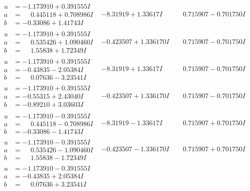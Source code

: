 \documentclass[1p]{elsarticle_modified}
\theoremstyle{definition}
\begin{document}
$$\begin{array}{c|c|c}
\begin{aligned}
u &= -1.173910 + 0.391555 I \\
a &= \phantom{-}0.445118 + 0.708986 I \\
b &= -0.33086 + 1.41743 I\end{aligned}
 & -8.31919 + 1.33617 I & \phantom{-}0.715907 - 0.701750 I \\ \hline\begin{aligned}
u &= -1.173910 + 0.391555 I \\
a &= \phantom{-}0.535426 + 1.090460 I \\
b &= \phantom{-}1.55838 + 1.72349 I\end{aligned}
 & -0.423507 + 1.336170 I & \phantom{-}0.715907 - 0.701750 I \\ \hline\begin{aligned}
u &= -1.173910 + 0.391555 I \\
a &= -0.43835 - 2.05384 I \\
b &= \phantom{-}0.07636 - 3.23541 I\end{aligned}
 & -8.31919 + 1.33617 I & \phantom{-}0.715907 - 0.701750 I \\ \hline\begin{aligned}
u &= -1.173910 + 0.391555 I \\
a &= -0.55315 + 2.43040 I \\
b &= -0.89210 + 3.03603 I\end{aligned}
 & -0.423507 + 1.336170 I & \phantom{-}0.715907 - 0.701750 I \\ \hline\begin{aligned}
u &= -1.173910 - 0.391555 I \\
a &= \phantom{-}0.445118 - 0.708986 I \\
b &= -0.33086 - 1.41743 I\end{aligned}
 & -8.31919 - 1.33617 I & \phantom{-}0.715907 + 0.701750 I \\ \hline\begin{aligned}
u &= -1.173910 - 0.391555 I \\
a &= \phantom{-}0.535426 - 1.090460 I \\
b &= \phantom{-}1.55838 - 1.72349 I\end{aligned}
 & -0.423507 - 1.336170 I & \phantom{-}0.715907 + 0.701750 I \\ \hline\begin{aligned}
u &= -1.173910 - 0.391555 I \\
a &= -0.43835 + 2.05384 I \\
b &= \phantom{-}0.07636 + 3.23541 I\end{aligned}

\end{array}$$
\end{document}
